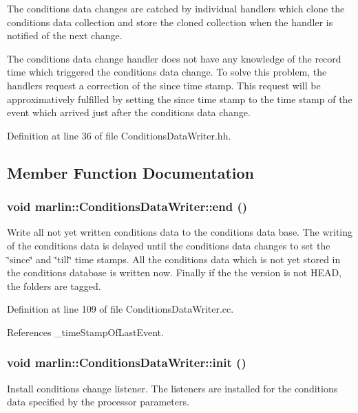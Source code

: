 The conditions data changes are catched by individual handlers which clone the conditions data collection and store the cloned collection when the handler is notified of the next change.

The conditions data change handler does not have any knowledge of the record time which triggered the conditions data change. To solve this problem, the handlers request a correction of the since time stamp. This request will be approximatively fulfilled by setting the since time stamp to the time stamp of the event which arrived just after the conditions data change. 

Definition at line 36 of file ConditionsDataWriter.hh.

\subsection{Member Function Documentation}
\subsubsection[{end}]{\setlength{\rightskip}{0pt plus 5cm}void marlin::ConditionsDataWriter::end ()}\label{classmarlin_1_1ConditionsDataWriter_a8ece634cea5d95989d574c128d303006}


Write all not yet written conditions data to the conditions data base. The writing of the conditions data is delayed until the conditions data changes to set the \char`\"{}since\char`\"{} and \char`\"{}till\char`\"{} time stamps. All the conditions data which is not yet stored in the conditions database is written now. Finally if the the version is not HEAD, the folders are tagged. 

Definition at line 109 of file ConditionsDataWriter.cc.

References \_\-timeStampOfLastEvent.
\subsubsection[{init}]{\setlength{\rightskip}{0pt plus 5cm}void marlin::ConditionsDataWriter::init ()}\label{classmarlin_1_1ConditionsDataWriter_a71c0b9b141b58a82aaf7df60939bf114}


Install conditions change listener. The listeners are installed for the conditions data specified by the processor parameters. 

